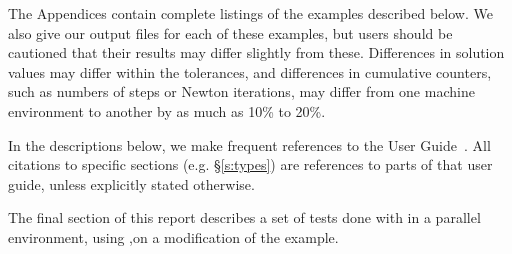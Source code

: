 The Appendices contain complete listings
of the examples described below.  We also give our output files for
each of these examples, but users should be cautioned that their
results may differ slightly from these.  Differences in solution
values may differ within the tolerances, and differences in cumulative
counters, such as numbers of steps or Newton iterations, may differ
from one machine environment to another by as much as 10\% to 20\%.

In the descriptions below, we make frequent references to the {\cvodes}
User Guide~\cite{cvodes2.1.0_ug}.  All citations to specific sections
(e.g. \S\ref{s:types}) are references to parts of that user guide, unless
explicitly stated otherwise.

The final section of this report describes a set of tests done with
{\cvodes} in a parallel environment, using {\nvecp},on a modification of
the  example.
